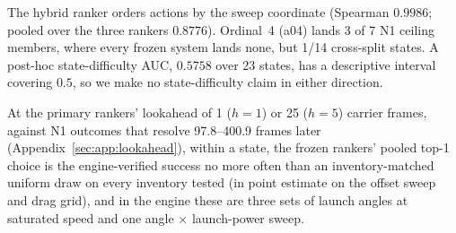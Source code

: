 The hybrid ranker orders actions by the sweep coordinate (Spearman $0.9986$; pooled over the three rankers $0.8776$). Ordinal~4 (a04) lands 3 of 7 N1 ceiling members, where every frozen system lands none, but 1/14 cross-split states. %
A post-hoc state-difficulty AUC, $0.5758$ over 23 states, has a descriptive interval covering $0.5$, so we make no state-difficulty claim in either direction. %

At the primary rankers' lookahead of 1 ($h{=}1$) or 25 ($h{=}5$) carrier frames, against N1 outcomes that resolve 97.8--400.9 frames later (Appendix~\ref{sec:app:lookahead}), within a state, the frozen rankers' pooled top-1 choice is the engine-verified success no more often than an inventory-matched uniform draw on every inventory tested (in point estimate on the offset sweep and drag grid), and in the engine these are three sets of launch angles at saturated speed and one angle $\times$ launch-power sweep. %

